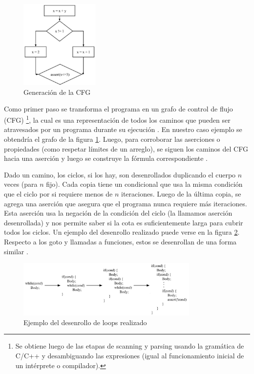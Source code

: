 \documentclass[runningheads]{llncs}
\begin{document}
\begin{figure}
  \vspace{-15pt}
  \centering
  \includegraphics[width=0.35\textwidth]{cfg-generation.jpeg}
  \caption{Generación de la CFG}
  \label{fig: cfg-generation}
  \vspace{-15pt}
\end{figure}
Como primer paso se transforma el programa en un grafo de control de flujo (CFG) \footnote{Se obtiene luego de las etapas de scanning y parsing usando la 
gramática de C/C++ y desambiguando las expresiones (igual al funcionamiento inicial de un intérprete o compilador).}, la cual es una representación de 
todos los caminos que pueden ser atravesados por un programa durante su ejecución \cite{cbmc-slides}. En nuestro caso ejemplo se obtendría el grafo de la figura \ref{fig: cfg-generation}.
Luego, para corroborar las aserciones o propiedades (como respetar límites de un arreglo), se siguen los caminos del CFG hacia una aserción y luego se construye 
la fórmula correspondiente \cite{cbmc-slides}.

Dado un camino, los ciclos, si los hay, son desenrollados duplicando el cuerpo $n$ veces (para $n$ fijo).
Cada copia tiene un condicional que usa la misma condición que el ciclo por si requiere menos de $n$ iteraciones.
Luego de la última copia, se agrega una aserción que asegura que el programa nunca requiere más iteraciones.
Esta aserción usa la negación de la condición del ciclo (la llamamos aserción desenrollada) y nos permite saber si la cota es suficientemente larga para cubrir todos los ciclos.
Un ejemplo del desenrollo realizado puede verse en la figura \ref{fig: loop-unwinding}.
Respecto a los goto y llamadas a funciones, estos se desenrollan de una forma similar \cite{tacas-2004}.

\begin{figure}[!htb]
  \centering
  \includegraphics[width=0.8\textwidth]{loop-unwinding.jpeg}
  \caption{Ejemplo del desenrollo de loops realizado}
  \label{fig: loop-unwinding}
\end{figure}
\end{document}
